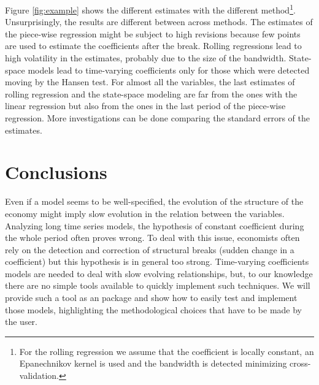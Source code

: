 \documentclass[12pt,a4paper]{article}
\def\thisfile{biblio}
\begin{document}
Figure \ref{fig:example} shows the different estimates with the different method\footnote{
  For the rolling regression we assume that the coefficient is locally constant, an Epanechnikov kernel is used and the bandwidth is detected minimizing cross-validation.}.
Unsurprisingly, the results are different between across methods.
The estimates of the piece-wise regression might be subject to high revisions because few points are used to estimate the coefficients after the break.
Rolling regressions lead to high volatility in the estimates, probably due to the size of the bandwidth.
State-space models lead to time-varying coefficients only for those which were detected moving by the Hansen test.
For almost all the variables, the last estimates of rolling regression and the state-space modeling are far from the ones with the linear regression but also from the ones in the last period of the piece-wise regression.
More investigations can be done comparing the standard errors of the estimates.




\section{Conclusions}

Even if a model seems to be well-specified, the evolution of the structure of the economy might imply slow evolution in the relation between the variables. Analyzing long time series models, the hypothesis of constant coefficient during the whole period often proves wrong.
To deal with this issue, economists often rely on the detection and correction of structural breaks (sudden change in a coefficient) but this hypothesis is in general too strong. 
Time-varying coefficients models are needed to deal with slow evolving relationships, but, to our knowledge there are no simple tools available to quickly implement such techniques. We will provide such a tool as an  package and show how to easily test and implement those models, highlighting the methodological choices that have to be made by the user.



\renewcommand{\refname}{References}



\end{document}
